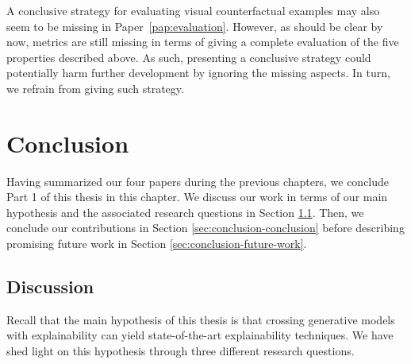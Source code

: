 \documentclass[11pt,a4paper,twoside,openright,final]{memoir}
\newcommand*{\paperref}[1]{Paper~\hyperref[#1]{\ref{#1}}}
\begin{document}
A conclusive strategy for evaluating visual counterfactual examples may also seem to be missing in \paperref{pap:evaluation}. 
However, as should be clear by now, metrics are still missing in terms of giving a complete evaluation of the five properties described above.
As such, presenting a conclusive strategy could potentially harm further development by ignoring the missing aspects. 
In turn, we refrain from giving such strategy. 

%
    
\chapter{Conclusion} 
Having summarized our four papers during the previous chapters, we conclude Part 1 of this thesis in this chapter.
We discuss our work in terms of our main hypothesis and the associated research questions in Section \ref{sec:conclusion-discussion}. 
Then, we conclude our contributions in Section \ref{sec:conclusion-conclusion} before
describing promising future work in Section \ref{sec:conclusion-future-work}. 

\section{Discussion}\label{sec:conclusion-discussion}
Recall that the main hypothesis of this thesis is that crossing generative models with explainability can yield state-of-the-art explainability techniques. 
We have shed light on this hypothesis through three different research questions.
\end{document}
